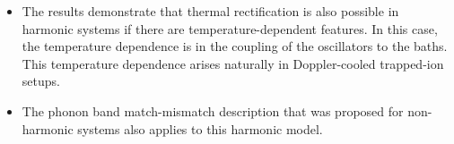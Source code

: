 \begin{itemize}
\begin{itemize}
    \item The results demonstrate that thermal rectification is also possible in
    harmonic systems if there are temperature-dependent features. In this case, the
    temperature dependence is in the coupling of the oscillators to the baths. This
    temperature dependence arises naturally in Doppler-cooled trapped-ion setups.

    \item The phonon band match-mismatch description that was proposed for non-harmonic
    systems also applies to this harmonic model.
  \end{itemize}

\end{itemize}

